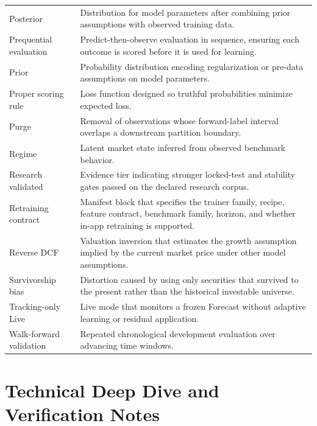 \documentclass[11pt]{article}
\begin{document}
\begin{longtable}{p{}p{}}
Posterior & Distribution for model parameters after combining prior assumptions with observed training data.\\
Prequential evaluation & Predict-then-observe evaluation in sequence, ensuring each outcome is scored before it is used for learning.\\
Prior & Probability distribution encoding regularization or pre-data assumptions on model parameters.\\
Proper scoring rule & Loss function designed so truthful probabilities minimize expected loss.\\
Purge & Removal of observations whose forward-label interval overlaps a downstream partition boundary.\\
Regime & Latent market state inferred from observed benchmark behavior.\\
Research validated & Evidence tier indicating stronger locked-test and stability gates passed on the declared research corpus.\\
Retraining contract & Manifest block that specifies the trainer family, recipe, feature contract, benchmark family, horizon, and whether in-app retraining is supported.\\
Reverse DCF & Valuation inversion that estimates the growth assumption implied by the current market price under other model assumptions.\\
Survivorship bias & Distortion caused by using only securities that survived to the present rather than the historical investable universe.\\
Tracking-only Live & Live mode that monitors a frozen Forecast without adaptive learning or residual application.\\
Walk-forward validation & Repeated chronological development evaluation over advancing time windows.\\
\bottomrule
\end{longtable}


\setcounter{section}{0}
\renewcommand{\thesection}{\arabic{section}}

\clearpage
\part{Technical Deep Dive and Verification Notes}
\end{document}
